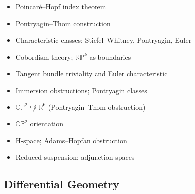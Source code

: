 \begin{itemize}
  \item Poincar\'e--Hopf index theorem
  \item Pontryagin--Thom construction
  \item Characteristic classes: Stiefel--Whitney, Pontryagin, Euler
  \item Cobordism theory; $\mathbb{RP}^k$ as boundaries
  \item Tangent bundle triviality and Euler characteristic
  \item Immersion obstructions; Pontryagin classes
  \item $\mathbb{CP}^2\not\hookrightarrow\mathbb{R}^6$ (Pontryagin--Thom obstruction)
  \item $\mathbb{CP}^2$ orientation
  \item H-space; Adams--Hopfan obstruction
  \item Reduced suspension; adjunction spaces
\end{itemize}

\subsection{Differential Geometry}

